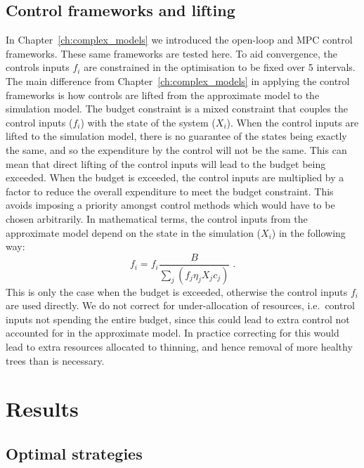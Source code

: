 \subsection{Control frameworks and lifting}\label{sec:ch6:lifting}

In Chapter~\ref{ch:complex_models} we introduced the open-loop and MPC control frameworks. These same frameworks are tested here. To aid convergence, the controls inputs $f_i$ are constrained in the optimisation to be fixed over \SI{5}{\year} intervals. The main difference from Chapter~\ref{ch:complex_models} in applying the control frameworks is how controls are lifted from the approximate model to the simulation model. The budget constraint is a mixed constraint that couples the control inputs ($f_i$) with the state of the system ($X_i$). When the control inputs are lifted to the simulation model, there is no guarantee of the states being exactly the same, and so the expenditure by the control will not be the same. This can mean that direct lifting of the control inputs will lead to the budget being exceeded. When the budget is exceeded, the control inputs are multiplied by a factor to reduce the overall expenditure to meet the budget constraint. This avoids imposing a priority amongst control methods which would have to be chosen arbitrarily. In mathematical terms, the control inputs from the approximate model depend on the state in the simulation ($X_i$) in the following way:
\begin{equation}
    f_i = f_i\frac{B}{\sum_j\left(f_j\eta_jX_jc_j\right)}\;.
\end{equation}
This is only the case when the budget is exceeded, otherwise the control inputs $f_i$ are used directly. We do not correct for under-allocation of resources, i.e.\ control inputs not spending the entire budget, since this could lead to extra control not accounted for in the approximate model. In practice correcting for this would lead to extra resources allocated to thinning, and hence removal of more healthy trees than is necessary.

\FloatBarrier
\section{Results\label{sec:ch6:results}}

\subsection{Optimal strategies}

